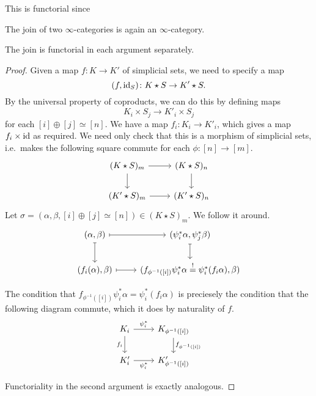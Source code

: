\documentclass[main.tex]{subfiles}
\begin{document}
This is functorial since

\begin{proposition}
  The join of two $\infty$-categories is again an $\infty$-category.
\end{proposition}

\begin{proposition}
  The join is functorial in each argument separately.
\end{proposition}
\begin{proof}
  Given a map $f\colon K \to K'$ of simplicial sets, we need to specify a map
  \begin{equation*}
    (f, \mathrm{id}_{S})\colon K \star S \to K' \star S.
  \end{equation*}
  By the universal property of coproducts, we can do this by defining maps
  \begin{equation*}
    K_{i} \times S_{j} \to K'_{i} \times S_{j}
  \end{equation*}
  for each $[i] \oplus [j] \simeq [n]$. We have a map $f_{i}\colon K_{i} \to K'_{i}$, which gives a map $f_{i} \times \mathrm{id}$ as required. We need only check that this is a morphism of simplicial sets, i.e.\ makes the following square commute for each $\phi\colon [n] \to [m]$.
  \begin{equation*}
    \begin{tikzcd}
      (K \star S)_{m}
      \arrow[r]
      \arrow[d]
      & (K \star S)_{n}
      \arrow[d]
      \\
      (K' \star S)_{m}
      \arrow[r]
      & (K' \star S)_{n}
    \end{tikzcd}
  \end{equation*}
  Let $\sigma = (\alpha, \beta, [i] \oplus [j] \simeq [n]) \in (K \star S)_{m}$. We follow it around.
  \begin{equation*}
    \begin{tikzcd}
      (\alpha, \beta)
      \arrow[r, mapsto]
      \arrow[d, mapsto]
      & (\psi_{i}^{*}\alpha, \psi_{j}^{*}\beta)
      \arrow[d, mapsto]
      \\
      (f_{i}(\alpha), \beta)
      \arrow[r, mapsto]
      & (f_{\phi^{-1}([i])}\psi_{i}^{*}\alpha \overset{!}{=} \psi_{i}^{*}(f_{i}\alpha), \beta)
    \end{tikzcd}
  \end{equation*}

  The condition that $f_{\phi^{-1}([i])}\psi_{i}^{*}\alpha = \psi_{i}^{*}(f_{i}\alpha)$ is preciesely the condition that the following diagram commute, which it does by naturality of $f$.
  \begin{equation*}
    \begin{tikzcd}
      K_{i}
      \arrow[r, "\psi_{i}^{*}"]
      \arrow[d, swap, "f_{i}"]
      & K_{\phi^{-1}([i])}
      \arrow[d, "f_{\phi^{-1}([i])}"]
      \\
      K'_{i}
      \arrow[r, swap, "\psi_{i}^{*}"]
      & K'_{\phi^{-1}([i])}
    \end{tikzcd}
  \end{equation*}

  Functoriality in the second argument is exactly analogous.
\end{proof}
\end{document}
